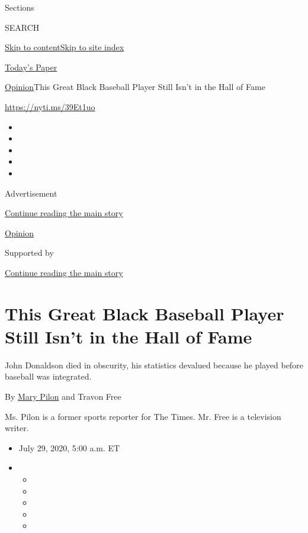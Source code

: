 Sections

SEARCH

\protect\hyperlink{site-content}{Skip to
content}\protect\hyperlink{site-index}{Skip to site index}

\href{https://myaccount.nytimes.com/auth/login?response_type=cookie\&client_id=vi}{}

\href{https://www.nytimes.com/section/todayspaper}{Today's Paper}

\href{/section/opinion}{Opinion}\textbar{}This Great Black Baseball
Player Still Isn't in the Hall of Fame

\url{https://nyti.ms/39Et1uo}

\begin{itemize}
\item
\item
\item
\item
\item
\end{itemize}

Advertisement

\protect\hyperlink{after-top}{Continue reading the main story}

\href{/section/opinion}{Opinion}

Supported by

\protect\hyperlink{after-sponsor}{Continue reading the main story}

\hypertarget{this-great-black-baseball-player-still-isnt-in-the-hall-of-fame}{%
\section{This Great Black Baseball Player Still Isn't in the Hall of
Fame}\label{this-great-black-baseball-player-still-isnt-in-the-hall-of-fame}}

John Donaldson died in obscurity, his statistics devalued because he
played before baseball was integrated.

By \href{https://www.nytimes.com/by/mary-pilon}{Mary Pilon} and Travon
Free

Ms. Pilon is a former sports reporter for The Times. Mr. Free is a
television writer.

\begin{itemize}
\item
  July 29, 2020, 5:00 a.m. ET
\item
  \begin{itemize}
  \item
  \item
  \item
  \item
  \item
  \end{itemize}
\end{itemize}


